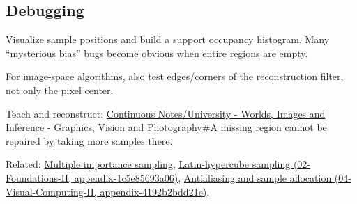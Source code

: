 \subsection{Debugging}\label{appendix-10308c3d753e-debugging}

Visualize sample positions and build a support occupancy histogram. Many ``mysterious bias'' bugs become obvious when entire regions are empty.

For image-space algorithms, also test edges/corners of the reconstruction filter, not only the pixel center.

Teach and reconstruct: \hyperref[03-visual-computing-i-ch007-a-missing-region-cannot-be-repaired-by-taking-more-samples-there]{Continuous Notes/University - Worlds, Images and Inference - Graphics, Vision and Photography\#A missing region cannot be repaired by taking more samples there}.

Related: \hyperref[appendix-ca8898faf1a6]{Multiple importance sampling}, \href{../02-Foundations-II/main.pdf\#nameddest=appendix-1c5e85693a06}{Latin-hypercube sampling (02-Foundations-II, appendix-1c5e85693a06)}, \href{../04-Visual-Computing-II/main.pdf\#nameddest=appendix-4192b2bdd21e}{Antialiasing and sample allocation (04-Visual-Computing-II, appendix-4192b2bdd21e)}.
